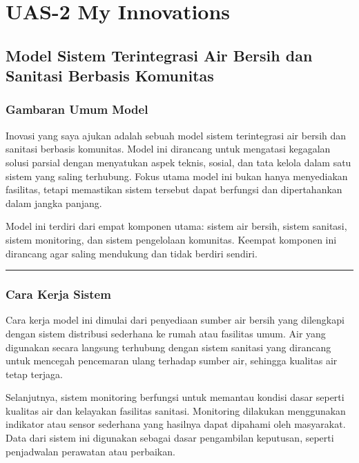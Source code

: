 \documentclass[
  letterpaper,
  DIV=11,
  numbers=noendperiod]{scrreprt}
\begin{document}

\chapter{UAS-2 My Innovations}\label{uas-2-my-innovations}

\section{Model Sistem Terintegrasi Air Bersih dan Sanitasi Berbasis
Komunitas}\label{model-sistem-terintegrasi-air-bersih-dan-sanitasi-berbasis-komunitas}

\subsection{Gambaran Umum Model}\label{gambaran-umum-model}

Inovasi yang saya ajukan adalah sebuah model sistem terintegrasi air
bersih dan sanitasi berbasis komunitas. Model ini dirancang untuk
mengatasi kegagalan solusi parsial dengan menyatukan aspek teknis,
sosial, dan tata kelola dalam satu sistem yang saling terhubung. Fokus
utama model ini bukan hanya menyediakan fasilitas, tetapi memastikan
sistem tersebut dapat berfungsi dan dipertahankan dalam jangka panjang.

Model ini terdiri dari empat komponen utama: sistem air bersih, sistem
sanitasi, sistem monitoring, dan sistem pengelolaan komunitas. Keempat
komponen ini dirancang agar saling mendukung dan tidak berdiri sendiri.

\begin{center}\rule{0.5\linewidth}{0.5pt}\end{center}

\subsection{Cara Kerja Sistem}\label{cara-kerja-sistem}

Cara kerja model ini dimulai dari penyediaan sumber air bersih yang
dilengkapi dengan sistem distribusi sederhana ke rumah atau fasilitas
umum. Air yang digunakan secara langsung terhubung dengan sistem
sanitasi yang dirancang untuk mencegah pencemaran ulang terhadap sumber
air, sehingga kualitas air tetap terjaga.

Selanjutnya, sistem monitoring berfungsi untuk memantau kondisi dasar
seperti kualitas air dan kelayakan fasilitas sanitasi. Monitoring
dilakukan menggunakan indikator atau sensor sederhana yang hasilnya
dapat dipahami oleh masyarakat. Data dari sistem ini digunakan sebagai
dasar pengambilan keputusan, seperti penjadwalan perawatan atau
perbaikan.
\end{document}
